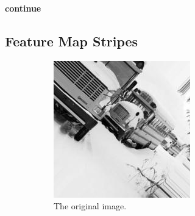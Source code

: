 \textbf{continue}

\subsection{Feature Map Stripes}\label{subsec:feature-map-stripes}

\begin{figure}
    \centering
    \begin{subfigure}{0.3\textwidth}
        \centering
        \includegraphics[width=\textwidth]{images/stripes/original.jpg}
        \caption{The original image.}
        \label{subfig:stripes_original}
    \end{subfigure}
    \hfill
    \begin{subfigure}{0.3\textwidth}
        \centering

\end{subfigure}
\end{figure}
